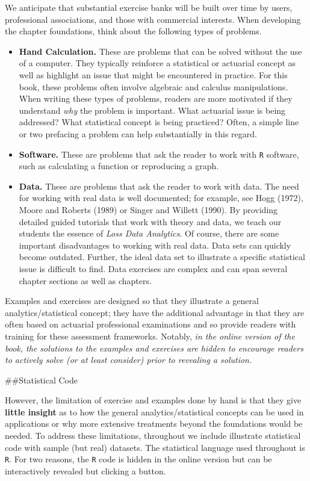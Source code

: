 \documentclass[
]{book}
\providecommand{\tightlist}{%
  \setlength{\itemsep}{0pt}\setlength{\parskip}{0pt}}
\begin{document}
We anticipate that substantial exercise banks will be built over time by users, professional associations, and those with commercial interests. When developing the chapter foundations, think about the following types of problems.

\begin{itemize}
\tightlist
\item
  \textbf{Hand Calculation.} These are problems that can be solved without the use of a computer. They typically reinforce a statistical or actuarial concept as well as highlight an issue that might be encountered in practice. For this book, these problems often involve algebraic and calculus manipulations. When writing these types of problems, readers are more motivated if they understand \emph{why} the problem is important. What actuarial issue is being addressed? What statistical concept is being practiced? Often, a simple line or two prefacing a problem can help substantially in this regard.
\item
  \textbf{Software.} These are problems that ask the reader to work with \texttt{R} software, such as calculating a function or reproducing a graph.
\item
  \textbf{Data.} These are problems that ask the reader to work with data. The need for working with real data is well documented; for example, see Hogg (1972), Moore and Roberts (1989) or Singer and Willett (1990). By providing detailed guided tutorials that work with theory and data, we teach our students the essence of \emph{Loss Data Analytics}. Of course, there are some important disadvantages to working with real data. Data sets can quickly become outdated. Further, the ideal data set to illustrate a specific statistical issue is difficult to find. Data exercises are complex and can span several chapter sections as well as chapters.
\end{itemize}

Examples and exercises are designed so that they illustrate a general analytics/statistical concept; they have the additional advantage in that they are often based on actuarial professional examinations and so provide readers with training for these assessment frameworks. Notably, \emph{in the online version of the book, the solutions to the examples and exercises are hidden to encourage readers to actively solve (or at least consider) prior to revealing a solution.}

\#\#Statistical Code

However, the limitation of exercise and examples done by hand is that they give \textbf{little insight} as to how the general analytics/statistical concepts can be used in applications or why more extensive treatments beyond the foundations would be needed. To address these limitations, throughout we include illustrate statistical code with sample (but real) datasets. The statistical language used throughout is \texttt{R}. For two reasons, the \texttt{R} code is hidden in the online version but can be interactively revealed but clicking a button.
\end{document}
